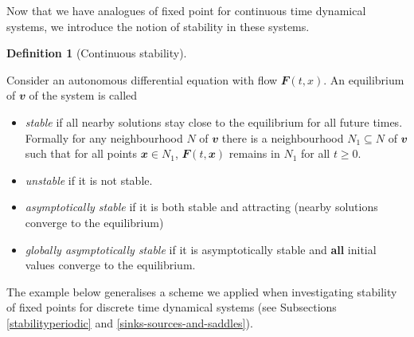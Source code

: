 \documentclass[
  a4paper,
  oneside,
  final]{krantz}
\providecommand{\tightlist}{%
  \setlength{\itemsep}{0pt}\setlength{\parskip}{0pt}}
\renewcommand{\v}[1]{{\mathbfit{#1}}}
\theoremstyle{definition}
\newtheorem{definition}{Definition}[chapter]
\theoremstyle{definition}
\theoremstyle{definition}
\theoremstyle{definition}
\theoremstyle{remark}
\begin{document}
Now that we have analogues of fixed point for continuous time dynamical systems, we introduce the notion of stability in these systems.

\begin{definition}[Continuous stability]
\protect\hypertarget{def:continuousstability}{}\label{def:continuousstability}

Consider an autonomous differential equation with flow \(\v{F}(t,x)\). An equilibrium of \(\v{v}\) of the system is called

\begin{itemize}
\tightlist
\item
  \emph{stable} if all nearby solutions stay close to the equilibrium for all future times. Formally for any neighbourhood \(N\) of \(\v{v}\) there is a neighbourhood \(N_1 \subseteq N\) of \(\v{v}\) such that for all points \(\v{x} \in N_1\), \(\v{F}(t, \v{x})\) remains in \(N_1\) for all \(t \ge 0\).
\item
  \emph{unstable} if it is not stable.
\item
  \emph{asymptotically stable} if it is both stable and attracting (nearby solutions converge to the equilibrium)
\item
  \emph{globally asymptotically stable} if it is asymptotically stable and \textbf{all} initial values converge to the equilibrium.
\end{itemize}

\end{definition}

The example below generalises a scheme we applied when investigating stability of fixed points for discrete time dynamical systems (see Subsections \ref{stabilityperiodic} and \ref{sinks-sources-and-saddles}).
\end{document}
